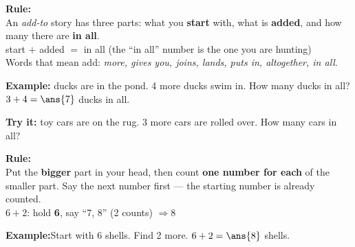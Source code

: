 \documentclass[12pt]{article}
\begin{document}


\begin{formulabox}
\textbf{Rule:}\\[4pt]
An \emph{add-to} story has three parts: what you \textbf{start} with, what is
\textbf{added}, and how many there are \textbf{in all}.\\[3pt]
\hspace*{0.5cm}start $+$ added $=$ in all \qquad (the ``in all'' number is the one you are hunting)\\[3pt]
Words that mean add: \emph{more, gives you, joins, lands, puts in, altogether, in all}.
\end{formulabox}

\begin{examplebox}
\textbf{Example:} ducks are in the pond. 4 more ducks swim in. How many ducks in all?
$3 + 4 = \ans{7}$ ducks in all.
\end{examplebox}

\begin{tryitbox}
\textbf{Try it:} toy cars are on the rug. 3 more cars are rolled over.
How many cars in all?\\[2pt]
\end{tryitbox}


\begin{formulabox}
\textbf{Rule:}\\[4pt]
Put the \textbf{bigger} part in your head, then count \textbf{one number for
each} of the smaller part. Say the next number first --- the starting number is
already counted.\\[3pt]
$6 + 2$: hold \textbf{6}, say ``7, 8'' \quad (2 counts) \quad $\Rightarrow 8$
\end{formulabox}

\begin{examplebox}
\textbf{Example:}\quad Start with 6 shells. Find 2 more.
$6 + 2 = \ans{8}$ shells.
\end{examplebox}
\end{document}
